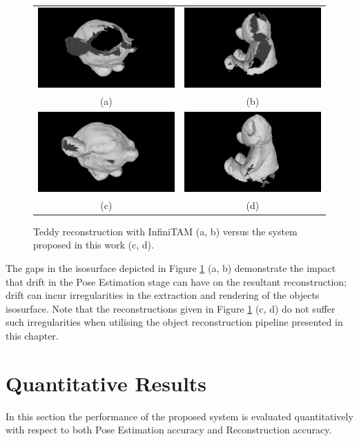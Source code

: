 \begin{figure}[ht]
  \label{fig:probobj_gappy_teddy}
	\centering
	\begin{tabular}{cc}
		\includegraphics[width=.2\linewidth]{figures/object_recon/gappy/one_scene00.png}&
    \includegraphics[width=.2\linewidth]{figures/object_recon/gappy/one_scene01.png}\\
    (a) & (b) \\
		\includegraphics[width=.2\linewidth]{figures/object_recon/gappy/multi_scene00.png}&
    \includegraphics[width=.2\linewidth]{figures/object_recon/gappy/multi_scene01.png}\\
    (c) & (d)\\
	\end{tabular}
	\caption{
    Teddy reconstruction with InfiniTAM (a, b) versus the system proposed in this 
    work (c, d).
	}
\end{figure}

The gaps in the isosurface depicted in Figure \ref{fig:probobj_gappy_teddy} (a, b) 
demonstrate the impact that drift in the Pose Estimation stage can have on the resultant 
reconstruction; drift can incur irregularities in the extraction and rendering of the objects 
isosurface. Note that the reconstructions given in Figure \ref{fig:probobj_gappy_teddy} 
(c, d) do not suffer such irregularities when utilising the object reconstruction pipeline 
presented in this chapter.

\section{Quantitative Results}
In this section the performance of the proposed system is evaluated quantitatively with respect 
to both Pose Estimation accuracy and Reconstruction accuracy. 

